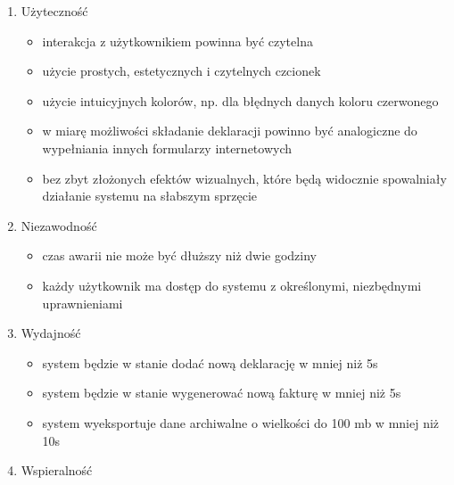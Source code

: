 
\begin{enumerate}
\item Użyteczność
	\begin{itemize}
		\item interakcja z użytkownikiem powinna być czytelna
		\item użycie prostych, estetycznych i czytelnych czcionek
		\item użycie intuicyjnych kolorów, np. dla błędnych danych koloru czerwonego
		\item w miarę możliwości składanie deklaracji powinno być analogiczne do wypełniania innych formularzy internetowych
		\item bez zbyt złożonych efektów wizualnych, które będą widocznie spowalniały działanie systemu na słabszym sprzęcie
	\end{itemize}

\item Niezawodność
	\begin{itemize}
		\item czas awarii nie może być dłuższy niż dwie godziny
		\item każdy użytkownik ma dostęp do systemu z określonymi, niezbędnymi uprawnieniami
	\end{itemize}

\item Wydajność
	\begin{itemize}
		\item system będzie w stanie dodać nową deklarację w mniej niż 5s
		\item system będzie w stanie wygenerować nową fakturę w mniej niż 5s
		\item system wyeksportuje dane archiwalne o wielkości do 100 mb w mniej niż 10s
	\end{itemize}

\item Wspieralność


\end{enumerate}